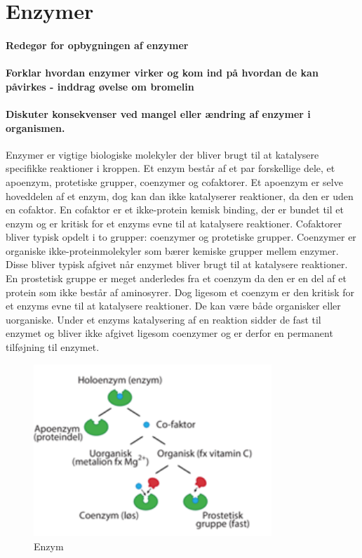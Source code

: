 \newpage
\part{Enzymer}
\subsection*{Redegør for opbygningen af enzymer}
\subsection*{Forklar hvordan enzymer virker og kom ind på hvordan de kan påvirkes - inddrag øvelse om bromelin}
\subsection*{Diskuter konsekvenser ved mangel eller ændring af enzymer i organismen. }
Enzymer er vigtige biologiske molekyler der bliver brugt til at katalysere specifikke reaktioner i kroppen. Et enzym består af et par forskellige dele, et apoenzym, protetiske grupper, coenzymer og cofaktorer. Et apoenzym er selve hoveddelen af et enzym, dog kan dan ikke katalyserer reaktioner, da den er uden en cofaktor. En cofaktor er et ikke-protein kemisk binding, der er bundet til et enzym og er kritisk for et enzyms evne til at katalysere reaktioner. Cofaktorer bliver typisk opdelt i to grupper: coenzymer og protetiske grupper. Coenzymer er organiske ikke-proteinmolekyler som bærer kemiske grupper mellem enzymer. Disse bliver typisk afgivet når enzymet bliver brugt til at katalysere reaktioner. En prostetisk gruppe er meget anderledes fra et coenzym da den er en del af et protein  som ikke består af aminosyrer. Dog ligesom et coenzym er den kritisk for et enzyms evne til at katalysere reaktioner. De kan være både organisker eller uorganiske. Under et enzyms katalysering af en reaktion sidder de fast til enzymet og bliver ikke afgivet ligesom coenzymer og er derfor en permanent tilføjning til enzymet.
\begin{figure}
    \centering
    \includegraphics[width=0.8\textwidth]{figurs/enzym.png}
    \caption{Enzym}
    \label{fig:enzym}
\end{figure}
